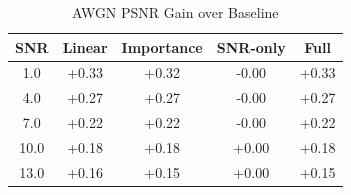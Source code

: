 \begin{table}[h]
\centering
\caption{AWGN PSNR Gain over Baseline}
\begin{tabular}{c|cccc}
\hline
SNR & Linear & Importance & SNR-only & Full \\ \hline
1.0 & +0.33 & +0.32 & -0.00 & +0.33 \\
4.0 & +0.27 & +0.27 & -0.00 & +0.27 \\
7.0 & +0.22 & +0.22 & -0.00 & +0.22 \\
10.0 & +0.18 & +0.18 & +0.00 & +0.18 \\
13.0 & +0.16 & +0.15 & +0.00 & +0.15 \\
\hline
\end{tabular}
\end{table}
